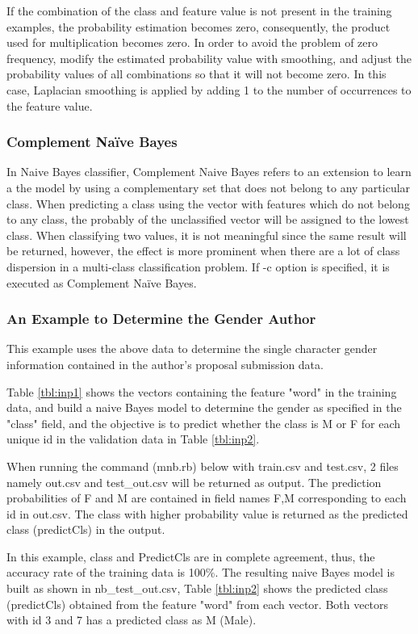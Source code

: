 If the combination of the class and feature value is not present in the training examples, the probability estimation becomes zero, consequently, the product used for multiplication becomes zero.
In order to avoid the problem of zero frequency, modify the estimated probability value with smoothing, and adjust the probability values of all combinations so that it will not become zero. In this case, Laplacian smoothing is applied by adding 1 to the number of occurrences to the feature value.

\subsubsection*{Complement Na{\"i}ve Bayes}
In Naive Bayes classifier, Complement Naive Bayes refers to an extension to learn a the model by using a complementary set that does not belong to any particular class.
When predicting a class using the vector with features which do not belong to any class,  the probably of the unclassified vector will be assigned to the lowest class. 
When classifying two values, it is not meaningful since the same result will be returned, however, the effect  is more prominent when there are a lot of class dispersion in a multi-class classification problem. 
If -c option is specified, it is executed as Complement Na{\"i}ve Bayes.

\subsubsection*{An Example to Determine the Gender Author}
This example uses the above data to determine the single character gender information contained in the author's proposal submission data.

Table \ref{tbl:inp1} shows the vectors containing the feature "word" in the training data, and build a naive Bayes model to determine the gender as specified in the "class" field, and the objective is to predict whether the class is M or F for each unique id in the validation data in Table \ref{tbl:inp2}. 

When running the command (mnb.rb) below with train.csv and test.csv, 2 files namely out.csv and test\_out.csv will be returned as output. The prediction probabilities of F and M are contained in field names F,M corresponding to each id in out.csv. The class with higher probability value is returned as the predicted class  (predictCls) in the output. 

In this example, class and PredictCls are in complete agreement, thus, the accuracy rate of the training data is 100\%. The resulting naive Bayes model is built as shown in nb\_test\_out.csv, Table \ref{tbl:inp2} shows the predicted class (predictCls) obtained from the feature "word" from each vector. Both vectors with id 3 and 7 has a predicted class as M (Male).  



